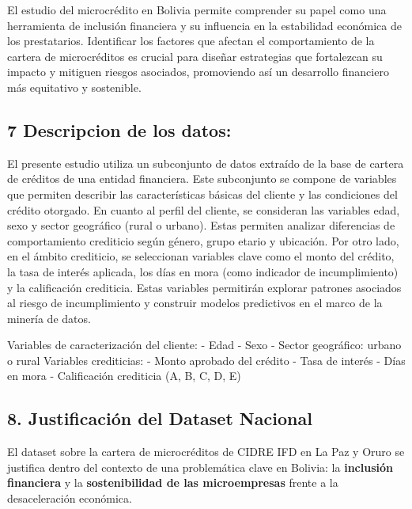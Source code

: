 \documentclass[Royal,times,sageh]{sagej}
\begin{document}
El estudio del microcrédito en Bolivia permite comprender su papel como
una herramienta de inclusión financiera y su influencia en la
estabilidad económica de los prestatarios. Identificar los factores que
afectan el comportamiento de la cartera de microcréditos es crucial para
diseñar estrategias que fortalezcan su impacto y mitiguen riesgos
asociados, promoviendo así un desarrollo financiero más equitativo y
sostenible.

\subsection{\texorpdfstring{7 \textbf{Descripcion de los
datos:}}{7 Descripcion de los datos:}}\label{descripcion-de-los-datos}

El presente estudio utiliza un subconjunto de datos extraído de la base
de cartera de créditos de una entidad financiera. Este subconjunto se
compone de variables que permiten describir las características básicas
del cliente y las condiciones del crédito otorgado. En cuanto al perfil
del cliente, se consideran las variables edad, sexo y sector geográfico
(rural o urbano). Estas permiten analizar diferencias de comportamiento
crediticio según género, grupo etario y ubicación. Por otro lado, en el
ámbito crediticio, se seleccionan variables clave como el monto del
crédito, la tasa de interés aplicada, los días en mora (como indicador
de incumplimiento) y la calificación crediticia. Estas variables
permitirán explorar patrones asociados al riesgo de incumplimiento y
construir modelos predictivos en el marco de la minería de datos.

Variables de caracterización del cliente: - Edad - Sexo - Sector
geográfico: urbano o rural Variables crediticias: - Monto aprobado del
crédito - Tasa de interés - Días en mora - Calificación crediticia (A,
B, C, D, E)

\subsection{\texorpdfstring{\textbf{8. Justificación del Dataset
Nacional}}{8. Justificación del Dataset Nacional}}\label{justificaciuxf3n-del-dataset-nacional}

El dataset sobre la cartera de microcréditos de CIDRE IFD en La Paz y
Oruro se justifica dentro del contexto de una problemática clave en
Bolivia: la \textbf{inclusión financiera} y la \textbf{sostenibilidad de
las microempresas} frente a la desaceleración económica.
\end{document}
